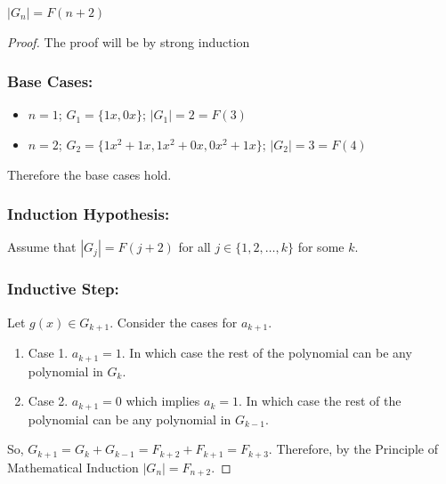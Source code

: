     \begin{theorem}
        $|G_n| = F(n+2)$
    \end{theorem}
    \begin{proof}
        The proof will be by strong induction
            \subsubsection*{\textbf{Base Cases:}}
            \begin{itemize}
                \item $n=1$; $G_1 =\{1x, 0x\}$; $|G_1|= 2 = F(3)$
                \item $n=2$; $G_2 =\{1x^2 + 1x, 1x^2 + 0x, 0x^2 + 1x \}$; $|G_2|= 3 = F(4)$
            \end{itemize}
            Therefore the base cases hold.
            \subsubsection*{\textbf{Induction Hypothesis:}}
                Assume that $|G_j| = F(j+2)$ for all $j \in \{1, 2, \ldots, k\}$ for some $k$.
            \subsubsection*{\textbf{Inductive Step:}}
                Let $g(x) \in G_{k+1}$. Consider the cases for $a_{k+1}$.
                \begin{enumerate}
                    \item Case 1. $a_{k+1} = 1$. In which case the rest of the polynomial can be any polynomial in $G_k$.
                    \item Case 2. $a_{k+1} = 0$ which implies $a_k = 1$. In which case the rest of the polynomial can be any polynomial in $G_{k-1}$.
                \end{enumerate}
                So, $G_{k+1} = G_k + G_{k-1} = F_{k+2} + F_{k+1} = F_{k+3}$. Therefore, by the Principle of Mathematical Induction $|G_n| = F_{n+2}$.
    \end{proof}

